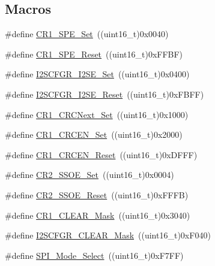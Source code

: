 \subsection*{Macros}
\begin{DoxyCompactItemize}
\item 
\#define \hyperlink{group___s_p_i___private___defines_ga74286f403309d32b56fed10aba2ebf91}{C\+R1\+\_\+\+S\+P\+E\+\_\+\+Set}~((uint16\+\_\+t)0x0040)
\item 
\#define \hyperlink{group___s_p_i___private___defines_ga7074d384e7f175968d1497a9275232bf}{C\+R1\+\_\+\+S\+P\+E\+\_\+\+Reset}~((uint16\+\_\+t)0x\+F\+F\+B\+F)
\item 
\#define \hyperlink{group___s_p_i___private___defines_gaded516c1bc1f0cb578174af3e296621b}{I2\+S\+C\+F\+G\+R\+\_\+\+I2\+S\+E\+\_\+\+Set}~((uint16\+\_\+t)0x0400)
\item 
\#define \hyperlink{group___s_p_i___private___defines_ga0ba63ca824d68ed9a84eafd6f4d64a3a}{I2\+S\+C\+F\+G\+R\+\_\+\+I2\+S\+E\+\_\+\+Reset}~((uint16\+\_\+t)0x\+F\+B\+F\+F)
\item 
\#define \hyperlink{group___s_p_i___private___defines_gaed3a2181ca4095a6488cf6c0ad7a29c6}{C\+R1\+\_\+\+C\+R\+C\+Next\+\_\+\+Set}~((uint16\+\_\+t)0x1000)
\item 
\#define \hyperlink{group___s_p_i___private___defines_gae0b545cdda02753c8e8863e883268011}{C\+R1\+\_\+\+C\+R\+C\+E\+N\+\_\+\+Set}~((uint16\+\_\+t)0x2000)
\item 
\#define \hyperlink{group___s_p_i___private___defines_gadd72ac04e7b2ff17053db04d240e17b1}{C\+R1\+\_\+\+C\+R\+C\+E\+N\+\_\+\+Reset}~((uint16\+\_\+t)0x\+D\+F\+F\+F)
\item 
\#define \hyperlink{group___s_p_i___private___defines_gaae3c2720c0b63d7cc26046969a45a6c1}{C\+R2\+\_\+\+S\+S\+O\+E\+\_\+\+Set}~((uint16\+\_\+t)0x0004)
\item 
\#define \hyperlink{group___s_p_i___private___defines_ga475caaaef8732d35e4c6fd3f21dc4e3c}{C\+R2\+\_\+\+S\+S\+O\+E\+\_\+\+Reset}~((uint16\+\_\+t)0x\+F\+F\+F\+B)
\item 
\#define \hyperlink{group___s_p_i___private___defines_ga67f7dd35ea3d1296677e5fc50b88fa90}{C\+R1\+\_\+\+C\+L\+E\+A\+R\+\_\+\+Mask}~((uint16\+\_\+t)0x3040)
\item 
\#define \hyperlink{group___s_p_i___private___defines_ga6cd1ac4e83d8de8e32a407d1a7971389}{I2\+S\+C\+F\+G\+R\+\_\+\+C\+L\+E\+A\+R\+\_\+\+Mask}~((uint16\+\_\+t)0x\+F040)
\item 
\#define \hyperlink{group___s_p_i___private___defines_ga71da9dd90bf7bfb6ed1748a1e181677a}{S\+P\+I\+\_\+\+Mode\+\_\+\+Select}~((uint16\+\_\+t)0x\+F7\+F\+F)

\end{DoxyCompactItemize}
